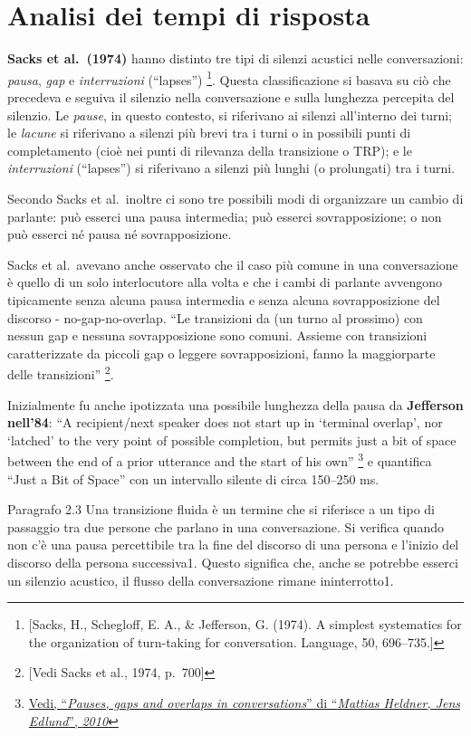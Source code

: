\documentclass[
]{article}
\begin{document}
\section{Analisi dei tempi di risposta}\label{analisi-dei-tempi-di-risposta}

\textbf{Sacks et al.~(1974)} hanno distinto tre tipi di silenzi acustici nelle conversazioni: \emph{pausa}, \emph{gap} e \emph{interruzioni} (``lapses'') \footnote{{[}Sacks, H., Schegloff, E. A., \& Jefferson, G. (1974). A simplest systematics for the organization of turn-taking for conversation. Language, 50, 696--735.{]}}. Questa classificazione si basava su ciò che precedeva e seguiva il silenzio nella conversazione e sulla lunghezza percepita del silenzio. Le \emph{pause}, in questo contesto, si riferivano ai silenzi all'interno dei turni; le \emph{lacune} si riferivano a silenzi più brevi tra i turni o in possibili punti di completamento (cioè nei punti di rilevanza della transizione o TRP); e le \emph{interruzioni} (``lapses'') si riferivano a silenzi più lunghi (o prolungati) tra i turni.

Secondo Sacks et al.~inoltre ci sono tre possibili modi di organizzare un cambio di parlante: può esserci una pausa intermedia; può esserci sovrapposizione; o non può esserci né pausa né sovrapposizione.

Sacks et al.~avevano anche osservato che il caso più comune in una conversazione è quello di un solo interlocutore alla volta e che i cambi di parlante avvengono tipicamente senza alcuna pausa intermedia e senza alcuna sovrapposizione del discorso - no-gap-no-overlap. ``Le transizioni da (un turno al prossimo) con nessun gap e nessuna sovrapposizione sono comuni. Assieme con transizioni caratterizzate da piccoli gap o leggere sovrapposizioni, fanno la maggiorparte delle transizioni'' \footnote{{[}Vedi Sacks et al., 1974, p.~700{]}}.

Inizialmente fu anche ipotizzata una possibile lunghezza della pausa da \textbf{Jefferson nell'84}: ``A recipient/next speaker does not start up in `terminal overlap', nor `latched' to the very point of possible completion, but permits just a bit of space between the end of a prior utterance and the start of his own'' \footnote{\href{DOC/1-s2.0-S0095447010000628-main.pdf}{Vedi, ``\emph{Pauses, gaps and overlaps in conversations}'' di ``\emph{Mattias Heldner, Jens Edlund}'', \emph{2010}}} e quantifica ``Just a Bit of Space'' con un intervallo silente di circa 150--250 ms.

Paragrafo 2.3 Una transizione fluida è un termine che si riferisce a un tipo di passaggio tra due persone che parlano in una conversazione. Si verifica quando non c'è una pausa percettibile tra la fine del discorso di una persona e l'inizio del discorso della persona successiva1. Questo significa che, anche se potrebbe esserci un silenzio acustico, il flusso della conversazione rimane ininterrotto1.
\end{document}
